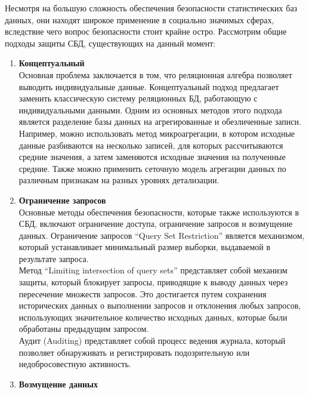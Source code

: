 Несмотря на большую сложность обеспечения безопасности статистических баз данных, они находят широкое применение в социально значимых сферах, вследствие чего вопрос безопасности стоит крайне остро. Рассмотрим общие подходы защиты СБД, существующих на данный момент: 

\begin{enumerate}
    \item \textbf{Концептуальный}
    \\

    Основная проблема заключается в том, что реляционная алгебра позволяет выводить индивидуальные данные. Концептуальный подход предлагает заменить классическую систему реляционных БД, работающую с индивидуальными данными. Одним из основных методов этого подхода является разделение базы данных на агрегированные и обезличенные записи. Например, можно использовать метод микроагрегации, в котором исходные данные разбиваются на несколько записей, для которых рассчитываются средние значения, а затем заменяются исходные значения на полученные средние. Также можно применить сеточную модель агрегации данных по различным признакам на разных уровнях детализации.

    \item \textbf{Ограничение запросов}
    \\

    Основные методы обеспечения безопасности, которые также используются в СБД, включают ограничение доступа, ограничение запросов и возмущение данных. Ограничение запросов \enquote{Query Set Restriction} является механизмом, который устанавливает минимальный размер выборки, выдаваемой в результате запроса.
    \\
    
	Метод \enquote{Limiting intersection of query sets} представляет собой механизм защиты, который блокирует запросы, приводящие к выводу данных через пересечение множеств запросов. Это достигается путем сохранения исторических данных о выполнении запросов и отклонения любых запросов, использующих значительное количество исходных данных, которые были обработаны предыдущим запросом.
    \\
    
	Аудит (Auditing) представляет собой процесс ведения журнала, который позволяет обнаруживать и регистрировать подозрительную или недобросовестную активность.

    \item \textbf{Возмущение данных}
    \\


\end{enumerate}
